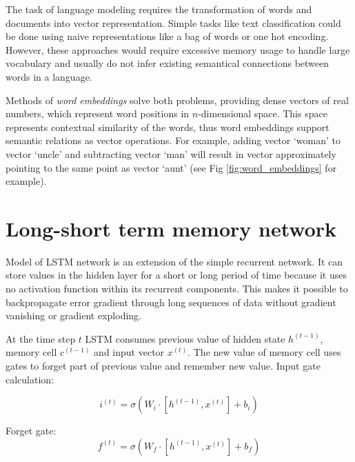 The task of language modeling requires the transformation of words and documents into vector representation. Simple tasks like text classification could be done using naive representations like a bag of words or one hot encoding. However, these approaches would require excessive memory usage to handle large vocabulary and usually do not infer existing semantical connections between words in a language. 

Methods of \emph{word embeddings} solve both problems, providing dense vectors of real numbers, which represent word positions in $n$-dimensional space. This space represents contextual similarity of the words, thus word embeddings support semantic relations as vector operations. For example, adding vector ‘woman’ to vector ‘uncle’ and subtracting vector ‘man’ will result in vector approximately pointing to the same point as vector ‘aunt’ (see Fig \ref{fig:word_embeddings} for example).

\section{Long-short term memory network}
Model of LSTM network is an extension of the simple recurrent network. It can store values in the hidden layer for a short or long period of time because it uses no activation function within its recurrent components. This makes it possible to backpropagate error gradient through long sequences of data without gradient vanishing or gradient exploding.

At the time step $t$ LSTM consumes previous value of hidden state $h^{(t-1)}$, memory cell $c^{(t-1)}$ and input vector $x^{(t)}$. The new value of memory cell uses gates to forget part of previous value and remember new value. Input gate calculation:

\begin{equation}
i^{(t)}=\sigma(W_i\cdot[h^{(t-1)}, x^{(t)}]+b_i)
\label{lstm:input}
\end{equation} 

Forget gate:
\begin{equation}
f^{(t)} = \sigma(W_f\cdot[h^{(t-1)},x^{(t)}] + b_f)
\label{lstm:ft}
\end{equation} 

